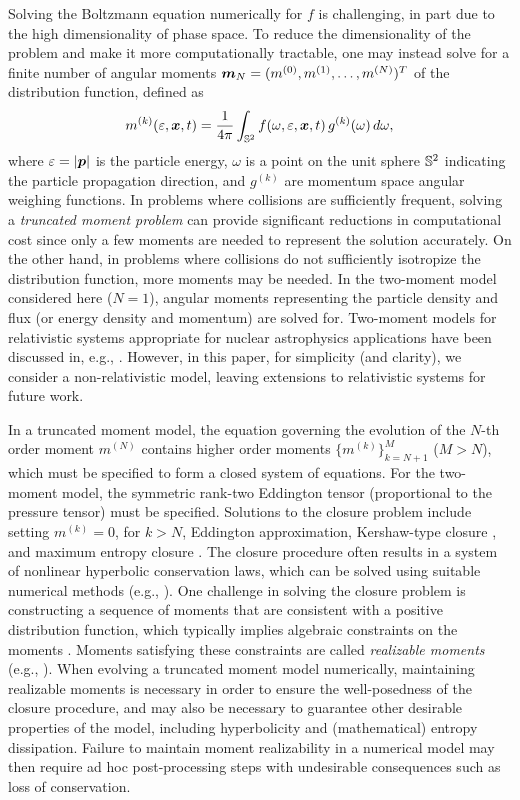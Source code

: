 Solving the Boltzmann equation numerically for $f$ is challenging, in part due to the high dimensionality of phase space.  
To reduce the dimensionality of the problem and make it more computationally tractable, one may instead solve for a finite number of angular moments $\boldsymbol{m}_{N}=(m^{(0)},m^{(1)},\ldots,m^{(N)})^{T}$ of the distribution function, defined as
\begin{equation}
  m^{(k)}(\varepsilon,\boldsymbol{x},t)=\frac{1}{4\pi}\int_{\mathbb{S}^{2}}f(\omega,\varepsilon,\boldsymbol{x},t)\,g^{(k)}(\omega)\,d\omega,
\end{equation}
where $\varepsilon=|\boldsymbol{p}|$ is the particle energy, $\omega$ is a point on the unit sphere $\mathbb{S}^{2}$ indicating the particle propagation direction, and $g^{(k)}$ are momentum space angular weighing functions.  
In problems where collisions are sufficiently frequent, solving a \emph{truncated moment problem} can provide significant reductions in computational cost since only a few moments are needed to represent the solution accurately.  
On the other hand, in problems where collisions do not sufficiently isotropize the distribution function, more moments may be needed.  
In the two-moment model considered here ($N=1$), angular moments representing the particle density and flux (or energy density and momentum) are solved for.  
Two-moment models for relativistic systems appropriate for nuclear astrophysics applications have been discussed in, e.g., \cite{lindquist_1966,andersonSpiegel_1972,thorne_1981,shibata_etal_2011,cardall_etal_2013a}.  
However, in this paper, for simplicity (and clarity), we consider a non-relativistic model, leaving extensions to relativistic systems for future work.  

In a truncated moment model, the equation governing the evolution of the $N$-th order moment $m^{(N)}$ contains higher order moments $\{m^{(k)}\}_{k=N+1}^{M}$ ($M>N$), which must be specified to form a closed system of equations.  
For the two-moment model, the symmetric rank-two Eddington tensor (proportional to the pressure tensor) must be specified.  
Solutions to the closure problem include setting $m^{(k)}=0$, for $k>N$, Eddington approximation, Kershaw-type closure \cite{kershaw_1976}, and maximum entropy closure \cite{minerbo_1978,cernohorskyBludman_1994}.  
The closure procedure often results in a system of nonlinear hyperbolic conservation laws, which can be solved using suitable numerical methods (e.g., \cite{leveque_1992}).  
One challenge in solving the closure problem is constructing a sequence of moments that are consistent with a positive distribution function, which typically implies algebraic constraints on the moments \cite{kershaw_1976,levermore_1984}.  
Moments satisfying these constraints are called \emph{realizable moments} (e.g., \cite{levermore_1996}).  
When evolving a truncated moment model numerically, maintaining realizable moments is necessary in order to ensure the well-posedness of the closure procedure, and may also be necessary to guarantee other desirable properties of the model, including hyperbolicity and (mathematical) entropy dissipation.  
Failure to maintain moment realizability in a numerical model may then require ad hoc post-processing steps with undesirable consequences such as loss of conservation.  

